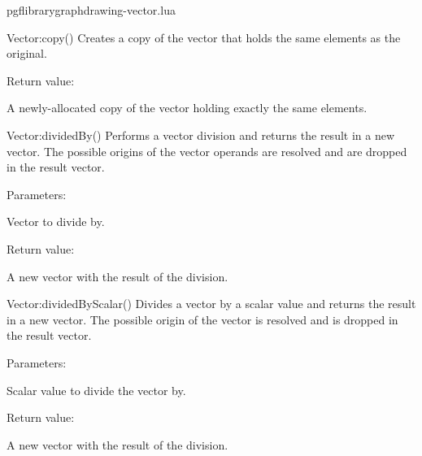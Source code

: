 
\begin{filedescription}{pgflibrarygraphdrawing-vector.lua}


\begin{luacommand}{{Vector:copy}()}
Creates a copy of the vector that holds the same elements as the original. 


Return value:
\begin{parameterdescription} 
  \item[] A newly-allocated copy of the vector holding exactly the same elements. 
\end{parameterdescription}


\end{luacommand}
\begin{luacommand}{{Vector:dividedBy}()}
Performs a vector division and returns the result in a new vector.  The possible origins of the vector operands are resolved and are dropped in the result vector. 

Parameters:
\begin{parameterdescription}
	\item[\meta{other}] Vector to divide by. 
\end{parameterdescription}


Return value:
\begin{parameterdescription} 
  \item[] A new vector with the result of the division. 
\end{parameterdescription}


\end{luacommand}
\begin{luacommand}{{Vector:dividedByScalar}()}
Divides a vector by a scalar value and returns the result in a new vector.  The possible origin of the vector is resolved and is dropped in the result vector. 

Parameters:
\begin{parameterdescription}
	\item[\meta{scalar}] Scalar value to divide the vector by. 
\end{parameterdescription}


Return value:
\begin{parameterdescription} 
  \item[] A new vector with the result of the division. 
\end{parameterdescription}



\end{luacommand}
\end{filedescription}
